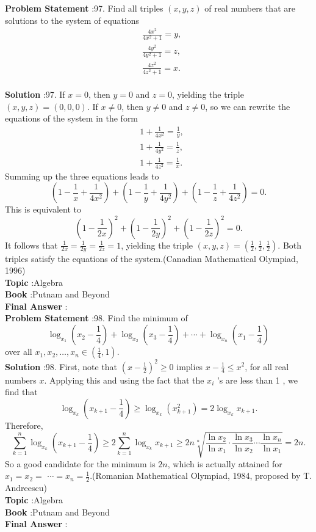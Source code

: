 \documentclass[10pt]{article}
\begin{document}
\textbf{Problem Statement} :97. Find all triples $(x, y, z)$ of real numbers that are solutions to the system of equations$$ \begin{aligned} &\frac{4 x^{2}}{4 x^{2}+1}=y, \\ &\frac{4 y^{2}}{4 y^{2}+1}=z, \\ &\frac{4 z^{2}}{4 z^{2}+1}=x . \end{aligned} $$\\
\textbf{Solution} :97. If $x=0$, then $y=0$ and $z=0$, yielding the triple $(x, y, z)=(0,0,0)$. If $x \neq 0$, then $y \neq 0$ and $z \neq 0$, so we can rewrite the equations of the system in the form$$ \begin{aligned} &1+\frac{1}{4 x^{2}}=\frac{1}{y}, \\ &1+\frac{1}{4 y^{2}}=\frac{1}{z}, \\ &1+\frac{1}{4 z^{2}}=\frac{1}{x} . \end{aligned} $$Summing up the three equations leads to$$ \left(1-\frac{1}{x}+\frac{1}{4 x^{2}}\right)+\left(1-\frac{1}{y}+\frac{1}{4 y^{2}}\right)+\left(1-\frac{1}{z}+\frac{1}{4 z^{2}}\right)=0 . $$This is equivalent to$$ \left(1-\frac{1}{2 x}\right)^{2}+\left(1-\frac{1}{2 y}\right)^{2}+\left(1-\frac{1}{2 z}\right)^{2}=0 . $$It follows that $\frac{1}{2 x}=\frac{1}{2 y}=\frac{1}{2 z}=1$, yielding the triple $(x, y, z)=\left(\frac{1}{2}, \frac{1}{2}, \frac{1}{2}\right)$. Both triples satisfy the equations of the system.(Canadian Mathematical Olympiad, 1996)\\
\textbf{Topic} :Algebra\\
\textbf{Book} :Putnam and Beyond\\
\textbf{Final Answer} :\\


\textbf{Problem Statement} :98. Find the minimum of$$ \log _{x_{1}}\left(x_{2}-\frac{1}{4}\right)+\log _{x_{2}}\left(x_{3}-\frac{1}{4}\right)+\cdots+\log _{x_{n}}\left(x_{1}-\frac{1}{4}\right) $$over all $x_{1}, x_{2}, \ldots, x_{n} \in\left(\frac{1}{4}, 1\right)$. \\
\textbf{Solution} :98. First, note that $\left(x-\frac{1}{2}\right)^{2} \geq 0$ implies $x-\frac{1}{4} \leq x^{2}$, for all real numbers $x$. Applying this and using the fact that the $x_{i}$ 's are less than 1 , we find that$$ \log _{x_{k}}\left(x_{k+1}-\frac{1}{4}\right) \geq \log _{x_{k}}\left(x_{k+1}^{2}\right)=2 \log _{x_{k}} x_{k+1} . $$Therefore,$$ \sum_{k=1}^{n} \log _{x_{k}}\left(x_{k+1}-\frac{1}{4}\right) \geq 2 \sum_{k=1}^{n} \log _{x_{k}} x_{k+1} \geq 2 n \sqrt[n]{\frac{\ln x_{2}}{\ln x_{1}} \cdot \frac{\ln x_{3}}{\ln x_{2}} \cdots \frac{\ln x_{n}}{\ln x_{1}}}=2 n . $$So a good candidate for the minimum is $2 n$, which is actually attained for $x_{1}=x_{2}=$ $\cdots=x_{n}=\frac{1}{2}$.(Romanian Mathematical Olympiad, 1984, proposed by T. Andreescu)\\
\textbf{Topic} :Algebra\\
\textbf{Book} :Putnam and Beyond\\
\textbf{Final Answer} :\\
\end{document}
